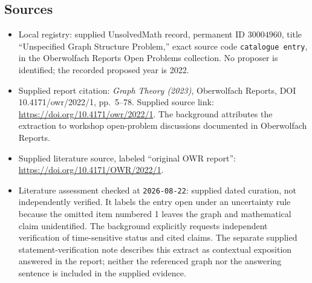\documentclass[11pt]{article}
\begin{document}
\subsection{Sources}
\begin{itemize}
\item Local registry: supplied UnsolvedMath record, permanent ID \(30004960\), title ``Unspecified Graph Structure Problem,'' exact source code \texttt{catalogue entry}, in the Oberwolfach Reports Open Problems collection. No proposer is identified; the recorded proposed year is 2022.
\item Supplied report citation: \emph{Graph Theory (2023)}, Oberwolfach Reports, DOI 10.4171/owr/2022/1, pp.\ 5--78. Supplied source link: \url{https://doi.org/10.4171/owr/2022/1}. The background attributes the extraction to workshop open-problem discussions documented in Oberwolfach Reports.
\item Supplied literature source, labeled ``original OWR report'': \url{https://doi.org/10.4171/OWR/2022/1}.
\item Literature assessment checked at \texttt{2026-08-22}: supplied dated curation, not independently verified. It labels the entry open under an uncertainty rule because the omitted item numbered 1 leaves the graph and mathematical claim unidentified. The background explicitly requests independent verification of time-sensitive status and cited claims. The separate supplied statement-verification note describes this extract as contextual exposition answered in the report; neither the referenced graph nor the answering sentence is included in the supplied evidence.
\end{itemize}
\end{document}
